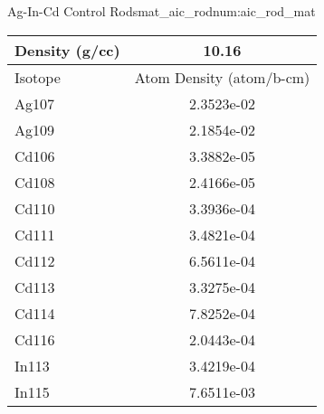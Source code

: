 \begin{matitem}{Ag-In-Cd Control Rods}{mat_aic_rod}{num:aic_rod_mat}
  \centering
  \begin{tabular}{l c}
    \toprule
    Density (g/cc) & 10.16 \\
    \midrule
    Isotope & Atom Density (atom/b-cm) \\
    \midrule
    \midrule
Ag107 & 2.3523e-02 \\
Ag109 & 2.1854e-02 \\
Cd106 & 3.3882e-05 \\
Cd108 & 2.4166e-05 \\
Cd110 & 3.3936e-04 \\
Cd111 & 3.4821e-04 \\
Cd112 & 6.5611e-04 \\
Cd113 & 3.3275e-04 \\
Cd114 & 7.8252e-04 \\
Cd116 & 2.0443e-04 \\
In113 & 3.4219e-04 \\
In115 & 7.6511e-03 \\

    \bottomrule
  \end{tabular}
\end{matitem}
